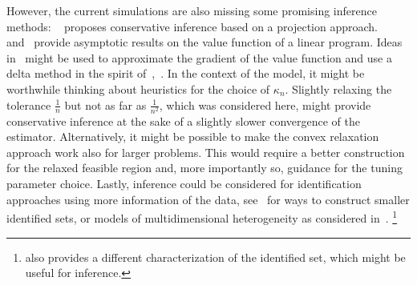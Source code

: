 \documentclass[12pt,a4paper,english]{article} %
\numberwithin{equation}{section}
\theoremstyle{definition}
\theoremstyle{remark}
\theoremstyle{plain}
\begin{document}
However, the current simulations are also missing some promising inference methods:
~\cite{bei2023inference} proposes conservative inference based on a projection approach.~\cite{bhattacharya2009inferring} and~\cite{freyberger2015identification} provide asymptotic results on the value function of a linear program.
Ideas in~\cite{de_wolf_smeers2021generalized} might be used to approximate the gradient of the value function and use a delta method in the spirit of~\cite{shapiro1991asymptotic},~\cite{fang2019infdirdiff}.
In the context of the model, it might be worthwhile thinking about heuristics for the choice of $\kappa_n$.
Slightly relaxing the tolerance $\frac{1}{n}$ but not as far as $\frac{1}{n^2}$, which was considered here, might provide conservative inference at the sake of a slightly slower convergence of the estimator.
Alternatively, it might be possible to make the convex relaxation approach work also for larger problems.
This would require a better construction for the relaxed feasible region and, more importantly so, guidance for the tuning parameter choice.
Lastly, inference could be considered for identification approaches using more information of the data, see~\cite{marx2024sharp} for ways to construct smaller identified sets, or models of multidimensional heterogeneity as considered in~\cite{dutz2021selection}.
\footnote{\cite{marx2024sharp} also provides a different characterization of the identified set, which might be useful for inference.}

\clearpage
\newpage





\clearpage
\newpage


\appendix
{}
\end{document}
